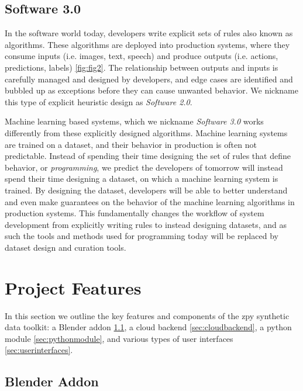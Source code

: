\documentclass{article}
\begin{document}
\subsection{Software 3.0}
\label{sec:software3.0}

In the software world today, developers write explicit sets of rules also known as algorithms. These algorithms are deployed into production systems, where they consume inputs (i.e. images, text, speech) and produce outputs (i.e. actions, predictions, labels) \ref{fig:fig2}. The relationship between outputs and inputs is carefully managed and designed by developers, and edge cases are identified and bubbled up as exceptions before they can cause unwanted behavior. We nickname this type of explicit heuristic design as \emph{Software 2.0}.

Machine learning based systems, which we nickname \emph{Software 3.0} works differently from these explicitly designed algorithms. Machine learning systems are trained on a dataset, and their behavior in production is often not predictable. Instead of spending their time designing the set of rules that define behavior, or \emph{programming}, we predict the developers of tomorrow will instead spend their time designing a dataset, on which a machine learning system is trained. By designing the dataset, developers will be able to better understand and even make guarantees on the behavior of the machine learning algorithms in production systems. This fundamentally changes the workflow of system development from explicitly writing rules to instead designing datasets, and as such the tools and methods used for programming today will be replaced by dataset design and curation tools.

\section{Project Features}
\label{sec:projectfeatures}

In this section we outline the key features and components of the zpy synthetic data toolkit: a Blender addon \ref{sec:blenderaddon}, a cloud backend \ref{sec:cloudbackend}, a python module \ref{sec:pythonmodule}, and various types of user interfaces \ref{sec:userinterfaces}.

\subsection{Blender Addon}
\label{sec:blenderaddon}
\end{document}
